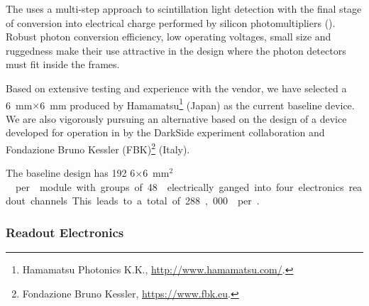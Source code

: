 The   uses a multi-step approach to scintillation light detection with the final stage of conversion into electrical charge performed by silicon photomultipliers (). Robust photon conversion efficiency, low operating voltages, small size and ruggedness make their use attractive in the \single design where the photon detectors must fit inside the  frames. 

Based on extensive testing and experience with the vendor, we have selected a \SI{6}{mm}$\times$\SI{6}{mm}  %
produced by Hamamatsu\footnote{Hamamatsu\texttrademark{} Photonics K.K., \url{http://www.hamamatsu.com/}.} (Japan) as the current baseline  device. 
We are also vigorously pursuing an alternative based on the design of a device developed for operation in \lar by the DarkSide experiment collaboration and Fondazione Bruno Kessler (FBK)\footnote{Fondazione Bruno Kessler\texttrademark{}, \url{https://www.fbk.eu}.} (Italy).

The baseline  design has 192 \num{6}$\times$\SI{6}{mm$^2$}  per  module with groups of 48  electrically ganged into four electronics readout channels. This leads to a total of 288,000  per . 





\subsubsection{Readout Electronics} 

